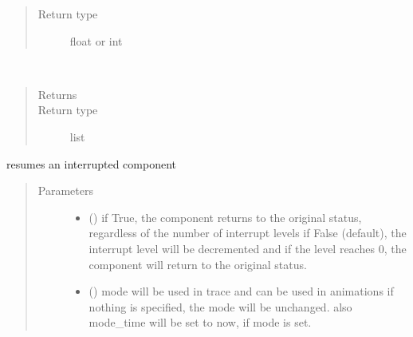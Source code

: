 \documentclass[letterpaper,10pt,english]{sphinxmanual}
\begin{document}
\begin{fulllineitems}
\begin{fulllineitems}
\begin{quote}
\begin{description}
\item[{Return type}] \leavevmode
float or int

\end{description}\end{quote}

\end{fulllineitems}


\begin{fulllineitems}
\label{\detokenize{Reference:salabim.Component.requested_resources}}~\begin{quote}\begin{description}
\item[{Returns}] \leavevmode
{}

\item[{Return type}] \leavevmode
list

\end{description}\end{quote}

\end{fulllineitems}


\begin{fulllineitems}
\label{\detokenize{Reference:salabim.Component.resume}}
resumes an interrupted component
\begin{quote}\begin{description}
\item[{Parameters}] \leavevmode\begin{itemize}
\item {} 
 () \textendash{} if True, the component returns to the original status, regardless of the number of interrupt levels 
if False (default), the interrupt level will be decremented and if the level reaches 0,
the component will return to the original status.

\item {} 
 () \textendash{} mode 
will be used in trace and can be used in animations 
if nothing is specified, the mode will be unchanged. 
also mode\_time will be set to now, if mode is set.


\end{itemize}
\end{description}
\end{quote}
\end{fulllineitems}
\end{fulllineitems}
\end{document}
